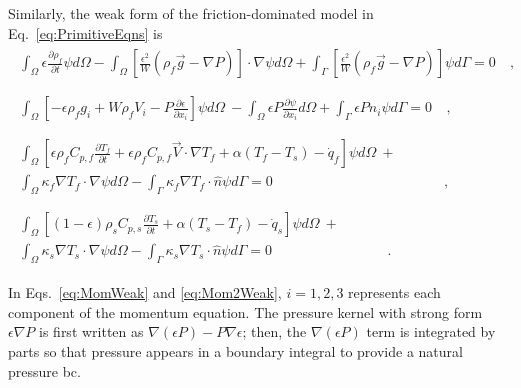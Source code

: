 \noindent Similarly, the weak form of the friction-dominated model in Eq.\ \eqref{eq:PrimitiveEqns} is
\begin{subequations}
\label{eq:PrimitiveWeakForms}
\begin{align}
\label{eq:Mass2Weak}
\begin{split}
\int_\Omega\epsilon\frac{\partial\rho_f}{\partial t}\psi d\Omega-\int_\Omega\left\lbrack\frac{\epsilon^2}{W}\left(\rho_f\vec{g}-\nabla P\right)\right\rbrack\cdot\nabla\psi d\Omega+\int_\Gamma\left\lbrack\frac{\epsilon^2}{W}\left(\rho_f\vec{g}-\nabla P\right)\right\rbrack \psi d\Gamma=0&\ ,\\
&
\end{split}\\
%
%
\label{eq:Mom2Weak}
\begin{split}\int_\Omega\left\lbrack-\epsilon\rho_f g_i+W\rho_fV_i-P\frac{\partial\epsilon}{\partial x_i}\right\rbrack\psi d\Omega\ -\int_\Omega \epsilon P\frac{\partial\psi}{\partial x_i}d\Omega+\int_\Gamma\epsilon Pn_i\psi d\Gamma=0&\ ,\\
&
\end{split}\\
%
%
\label{eq:Energy2Weak}
\begin{split}
\int_\Omega\left\lbrack\epsilon\rho_fC_{p,f}\frac{\partial T_f}{\partial t}+\epsilon\rho_fC_{p,f}\vec{V}\cdot\nabla T_f+\alpha(T_f-T_s)-\dot{q}_f\right\rbrack\psi d\Omega\ +\hspace{1cm}\\
\int_\Omega\kappa_f\nabla T_f\cdot\nabla \psi d\Omega-\int_\Gamma\kappa_f\nabla T_f\cdot\hat{n}\psi d\Gamma=0&\ ,\\
&
\end{split}\\
%
%
\label{eq:PrimitiveEnergyWeak}
\begin{split}\int_\Omega\left\lbrack(1-\epsilon)\rho_sC_{p,s}\frac{\partial T_s}{\partial t}+\alpha(T_s-T_f)-\dot{q}_s\right\rbrack\psi d\Omega\ +\hspace{1cm}\\
\int_\Omega\kappa_s\nabla T_s\cdot\nabla\psi d\Omega-\int_\Gamma\kappa_s\nabla T_s\cdot\hat{n}\psi d\Gamma=0&\ .\end{split}
\end{align}
\end{subequations}

\noindent In Eqs.\ \eqref{eq:MomWeak} and \eqref{eq:Mom2Weak}, \(i=1,2,3\) represents each component of the momentum equation. The pressure kernel with strong form \(\epsilon\nabla P\) is first written as \(\nabla(\epsilon P)-P\nabla\epsilon\); then, the \(\nabla(\epsilon P)\) term is integrated by parts so that pressure appears in a boundary integral to provide a natural pressure \gls{bc}. 

